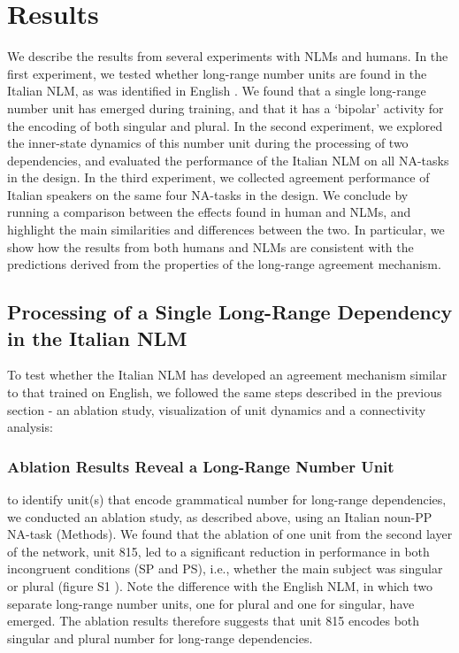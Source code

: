 \section{Results}
We describe the results from several experiments with NLMs and humans. In the first experiment, we tested whether long-range number units are found in the Italian NLM, as was identified in English \citep{lakretz2019emergence}. We found that a single long-range number unit has emerged during training, and that it has a `bipolar' activity for the encoding of both singular and plural. In the second experiment, we explored the inner-state dynamics of this number unit during the processing of two dependencies, and evaluated the performance of the Italian NLM on all NA-tasks in the design. In the third experiment, we collected agreement performance of Italian speakers on the same four NA-tasks in the design. We conclude by running a comparison between the effects found in human and NLMs, and highlight the main similarities and differences between the two. In particular, we show how the results from both humans and NLMs are consistent with the predictions derived from the properties of the long-range agreement mechanism. 

\subsection{Processing of a Single Long-Range Dependency in the Italian NLM}
To test whether the Italian NLM has developed an agreement mechanism similar to that trained on English, we followed the same steps described in the previous section - an ablation study, visualization of unit dynamics and a connectivity analysis:

\subsubsection{Ablation Results Reveal a Long-Range Number Unit} to identify unit(s) that encode grammatical number for long-range dependencies, we conducted an ablation study, as described above, using an Italian noun-PP NA-task (Methods). We found that the ablation of one unit from the second layer of the network, unit 815, led to a significant reduction in performance in both incongruent conditions (SP and PS), i.e., whether the main subject was singular or plural (figure S1 ). Note the difference with the English NLM, in which two separate long-range number units, one for plural and one for singular, have emerged. The ablation results therefore suggests that unit 815 encodes both singular and plural number for long-range dependencies.

